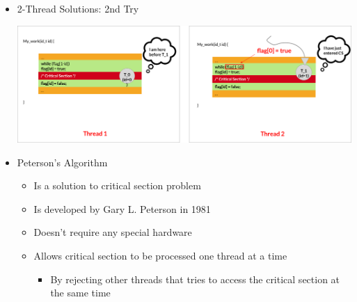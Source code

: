 \documentclass[12pt]{article}
\begin{document}
\begin{itemize}
    \item 2-Thread Solutions: 2nd Try


    \begin{center}
    \includegraphics[width=\linewidth]{images/week_2_notes_2_12.png}
    \end{center}

    \item Peterson's Algorithm

    \begin{itemize}
        \item Is a solution to critical section problem
        \item Is developed by Gary L. Peterson in 1981
        \item Doesn't require any special hardware
        \item Allows critical section to be processed one thread at a time
        \begin{itemize}
            \item By rejecting other threads that tries to access the
            critical section at the same time
        \end{itemize}
    \end{itemize}


\end{itemize}
\end{document}
